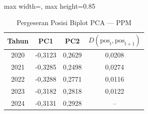 \begin{table}[H]
\centering
\caption{Pergeseran Posisi Biplot PCA --- PPM} \label{tab:appjarak_pca_loading_ppm}
\begin{adjustbox}{max width=\textwidth, max height=0.85\textheight}
\begin{tabular}{|c|c|c|c|}
\hline
\textbf{Tahun} & \textbf{PC1} & \textbf{PC2} & \textbf{$D(\text{pos}_t, \text{pos}_{t+1})$} \\
\hline
2020 & -0,3123 & 0,2629 & 0,0208 \\
2021 & -0,3285 & 0,2498 & 0,0274 \\
2022 & -0,3288 & 0,2771 & 0,0116 \\
2023 & -0,3182 & 0,2818 & 0,0122 \\
2024 & -0,3131 & 0,2928 & -- \\
\hline
\end{tabular}
\end{adjustbox}
\end{table}